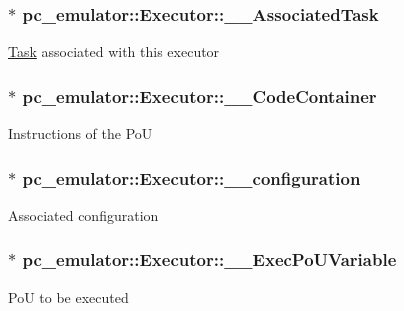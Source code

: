 \subsubsection[{\texorpdfstring{\+\_\+\+\_\+\+Associated\+Task}{__AssociatedTask}}]{$\ast$ pc\+\_\+emulator\+::\+Executor\+::\+\_\+\+\_\+\+Associated\+Task}\hypertarget{classpc__emulator_1_1Executor_ac1f6ee2ee941691f69f0d51827fd2a06}{}\label{classpc__emulator_1_1Executor_ac1f6ee2ee941691f69f0d51827fd2a06}
\hyperlink{classpc__emulator_1_1Task}{Task} associated with this executor 
\subsubsection[{\texorpdfstring{\+\_\+\+\_\+\+Code\+Container}{__CodeContainer}}]{$\ast$ pc\+\_\+emulator\+::\+Executor\+::\+\_\+\+\_\+\+Code\+Container}\hypertarget{classpc__emulator_1_1Executor_a26032bb8f4fec484e14f32d07db89f5d}{}\label{classpc__emulator_1_1Executor_a26032bb8f4fec484e14f32d07db89f5d}
Instructions of the PoU 
\subsubsection[{\texorpdfstring{\+\_\+\+\_\+configuration}{__configuration}}]{$\ast$ pc\+\_\+emulator\+::\+Executor\+::\+\_\+\+\_\+configuration}\hypertarget{classpc__emulator_1_1Executor_abcffb5c87513b158451390af932327e6}{}\label{classpc__emulator_1_1Executor_abcffb5c87513b158451390af932327e6}
Associated configuration 
\subsubsection[{\texorpdfstring{\+\_\+\+\_\+\+Exec\+Po\+U\+Variable}{__ExecPoUVariable}}]{$\ast$ pc\+\_\+emulator\+::\+Executor\+::\+\_\+\+\_\+\+Exec\+Po\+U\+Variable}\hypertarget{classpc__emulator_1_1Executor_a5b88e4a18e03884a98ae194c40d08803}{}\label{classpc__emulator_1_1Executor_a5b88e4a18e03884a98ae194c40d08803}
PoU to be executed 
